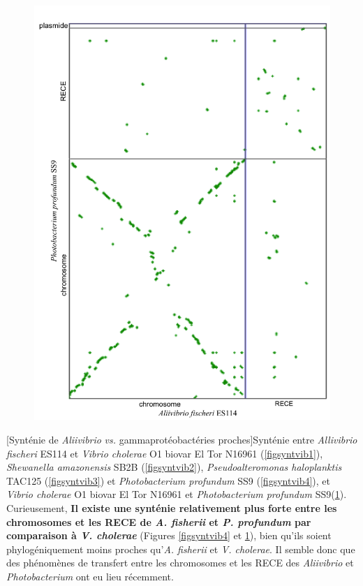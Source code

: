 \begin{figure}[H]
\centering
	\begin{minipage}{0.5\textwidth}
   		\includegraphics[width=\textwidth]{./img/synteny/new/fig8_12d.png}
   		\label{figsyntvib5}
    \end{minipage} 
\end{figure}      
      
[Synténie de \textit{Aliivibrio} \textit{vs.} gammaprotéobactéries proches]{Synténie entre \textit{Allivibrio fischeri} ES114 et \textit{Vibrio cholerae} O1 biovar El Tor N16961 (\ref{figsyntvib1}), \textit{Shewanella amazonensis} SB2B (\ref{figsyntvib2}), \textit{Pseudoalteromonas haloplanktis} TAC125 (\ref{figsyntvib3}) et \textit{Photobacterium profundum} SS9 (\ref{figsyntvib4}), et  \textit{Vibrio cholerae} O1 biovar El Tor N16961 et \textit{Photobacterium profundum} SS9(\ref{figsyntvib5}).}\label{figsyntvib}
\vspace{1cm}
Curieusement, \textbf{Il existe une synténie relativement plus forte entre les chromosomes et les RECE de \textit{A. fisherii} et \textit{P. profundum} par comparaison à \textit{V. cholerae}} (Figures \ref{figsyntvib4} et \ref{figsyntvib5}), bien qu'ils soient phylogéniquement moins proches qu'\textit{A. fisherii} et \textit{V. cholerae}. Il semble donc que des phénomènes de transfert entre les chromosomes et les RECE des \textit{Aliivibrio} et \textit{Photobacterium} ont eu lieu récemment.

